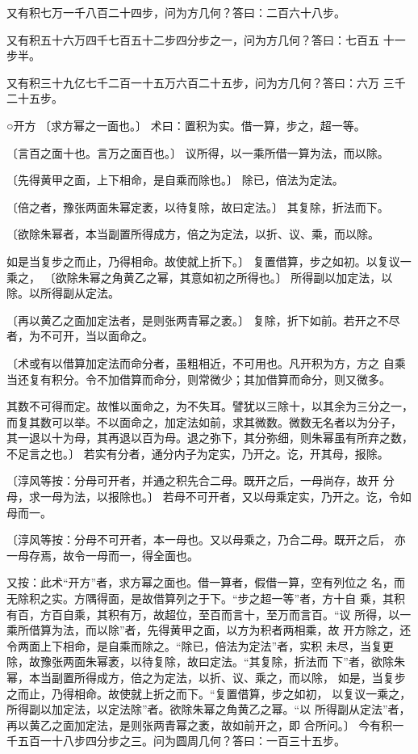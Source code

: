 \documentclass[12pt,UTF8]{ctexbook}
\begin{document}
又有积七万一千八百二十四步，问为方几何？答曰：二百六十八步。

又有积五十六万四千七百五十二步四分步之一，问为方几何？答曰：七百五 十一步半。

又有积三十九亿七千二百一十五万六百二十五步，问为方几何？答曰：六万 三千二十五步。

○开方 〔求方幂之一面也。〕 术曰：置积为实。借一算，步之，超一等。

〔言百之面十也。言万之面百也。〕 议所得，以一乘所借一算为法，而以除。

〔先得黄甲之面，上下相命，是自乘而除也。〕 除已，倍法为定法。

〔倍之者，豫张两面朱幂定袤，以待复除，故曰定法。〕 其复除，折法而下。

〔欲除朱幂者，本当副置所得成方，倍之为定法，以折、议、乘，而以除。

如是当复步之而止，乃得相命。故使就上折下。〕 复置借算，步之如初。以复议一乘之， 〔欲除朱幂之角黄乙之幂，其意如初之所得也。〕 所得副以加定法，以除。以所得副从定法。

〔再以黄乙之面加定法者，是则张两青幂之袤。〕 复除，折下如前。若开之不尽者，为不可开，当以面命之。

〔术或有以借算加定法而命分者，虽粗相近，不可用也。凡开积为方，方之 自乘当还复有积分。令不加借算而命分，则常微少；其加借算而命分，则又微多。

其数不可得而定。故惟以面命之，为不失耳。譬犹以三除十，以其余为三分之一， 而复其数可以举。不以面命之，加定法如前，求其微数。微数无名者以为分子， 其一退以十为母，其再退以百为母。退之弥下，其分弥细，则朱幂虽有所弃之数， 不足言之也。〕 若实有分者，通分内子为定实，乃开之。讫，开其母，报除。

〔淳风等按：分母可开者，并通之积先合二母。既开之后，一母尚存，故开 分母，求一母为法，以报除也。〕 若母不可开者，又以母乘定实，乃开之。讫，令如母而一。

〔淳风等按：分母不可开者，本一母也。又以母乘之，乃合二母。既开之后， 亦一母存焉，故令一母而一，得全面也。

又按：此术“开方”者，求方幂之面也。借一算者，假借一算，空有列位之 名，而无除积之实。方隅得面，是故借算列之于下。“步之超一等”者，方十自 乘，其积有百，方百自乘，其积有万，故超位，至百而言十，至万而言百。“议 所得，以一乘所借算为法，而以除”者，先得黄甲之面，以方为积者两相乘，故 开方除之，还令两面上下相命，是自乘而除之。“除已，倍法为定法”者，实积 未尽，当复更除，故豫张两面朱幂袤，以待复除，故曰定法。“其复除，折法而 下”者，欲除朱幂，本当副置所得成方，倍之为定法，以折、议、乘之，而以除， 如是，当复步之而止，乃得相命。故使就上折之而下。“复置借算，步之如初， 以复议一乘之，所得副以加定法，以定法除”者。欲除朱幂之角黄乙之幂。“以 所得副从定法”者，再以黄乙之面加定法，是则张两青幂之袤，故如前开之，即 合所问。〕 今有积一千五百一十八步四分步之三。问为圆周几何？答曰：一百三十五步。
\end{document}
